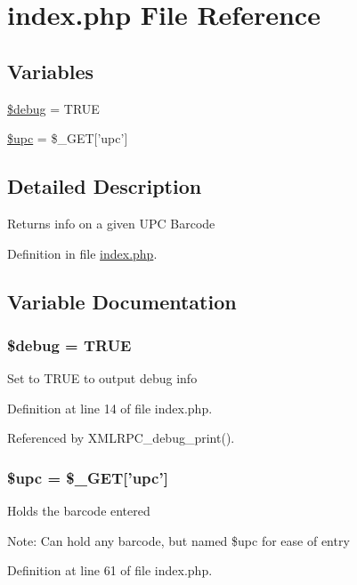 \hypertarget{index_8php}{
\section{index.php File Reference}
\label{index_8php}
}
\subsection*{Variables}
\begin{CompactItemize}
\item 
\hyperlink{index_8php_85ae3e64cd40e9564adceb010085e9dd}{\$debug} = TRUE
\item 
\hyperlink{index_8php_a9aa17ff51d69075d75cfc5bc4e89b34}{\$upc} = \$\_\-GET\mbox{[}'upc'\mbox{]}
\end{CompactItemize}


\subsection{Detailed Description}
Returns info on a given UPC Barcode 

Definition in file \hyperlink{index_8php-source}{index.php}.

\subsection{Variable Documentation}
\hypertarget{index_8php_85ae3e64cd40e9564adceb010085e9dd}{
\subsubsection{\setlength{\rightskip}{0pt plus 5cm}\$debug = TRUE}}
\label{index_8php_85ae3e64cd40e9564adceb010085e9dd}


Set to TRUE to output debug info 

Definition at line 14 of file index.php.

Referenced by XMLRPC\_\-debug\_\-print().\hypertarget{index_8php_a9aa17ff51d69075d75cfc5bc4e89b34}{
\subsubsection{\setlength{\rightskip}{0pt plus 5cm}\$upc = \$\_\-GET\mbox{[}'upc'\mbox{]}}}
\label{index_8php_a9aa17ff51d69075d75cfc5bc4e89b34}


Holds the barcode entered \begin{Desc}
\item[Note:]Can hold any barcode, but named \$upc for ease of entry \end{Desc}


Definition at line 61 of file index.php.
